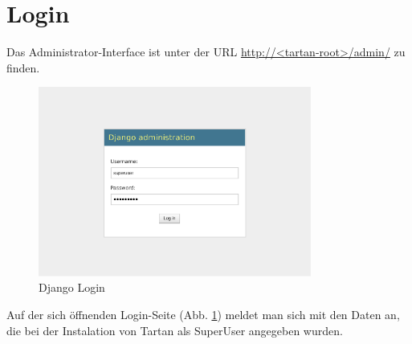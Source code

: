 \section{Login}
Das Administrator-Interface ist unter der URL \url{http://<tartan-root>/admin/} zu finden.
\begin{figure}
  \centering
  \includegraphics[width=0.8\textwidth]{05/django_login.pdf}
  \caption{Django Login}
  \label{loginPrompt}
\end{figure}
Auf der sich öffnenden Login-Seite (Abb. \ref{loginPrompt}) meldet man sich mit den Daten an, die bei der Instalation von Tartan als SuperUser angegeben wurden.